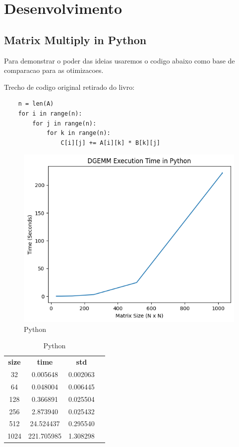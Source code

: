 \documentclass[12pt]{article}
\begin{document}
\section{Desenvolvimento}

\subsection{Matrix Multiply in Python}

Para demonstrar o poder das ideias usaremos o codigo abaixo como base de comparacao para as otimizacoes.

Trecho de codigo original retirado do livro:

\begin{lstlisting}
    n = len(A)
    for i in range(n):
        for j in range(n):
            for k in range(n):
                C[i][j] += A[i][k] * B[k][j]
\end{lstlisting}

\begin{figure}[h]
    \centering
    \includegraphics[scale=0.6]{figures/python.png}
    \caption{Python}
    \label{fig:python}
\end{figure}

\begin{table}[h]
    \centering
    \label{tab:python}
    \begin{tabular}{cccc}
        \textbf{size} & \textbf{time} & \textbf{std} \\
        32 & 0.005648 & 0.002063 \\
        64 & 0.048004 & 0.006445 \\
        128 & 0.366891 & 0.025504 \\
        256 & 2.873940 & 0.025432 \\
        512 & 24.524437 & 0.295540 \\
        1024 & 221.705985 & 1.308298 \\
    \end{tabular}
    \caption{Python}
\end{table}
\end{document}
